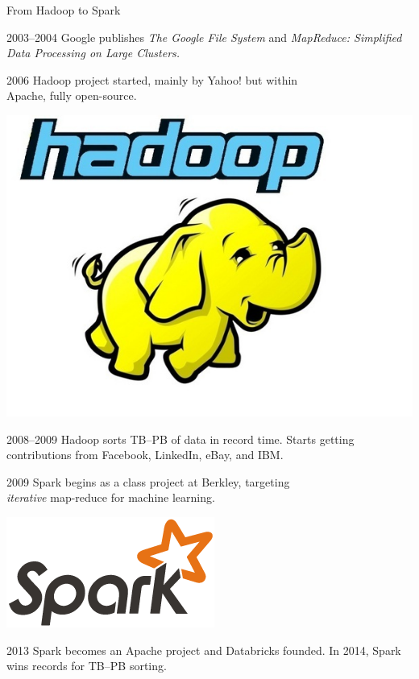 \documentclass{beamer}
\begin{document}
\begin{frame}{From Hadoop to Spark}
\begin{block}{2003--2004}
Google publishes {\it The Google File System} and {\it MapReduce: Simplified Data Processing on Large Clusters.}
\end{block}

\begin{block}{2006}
Hadoop project started, mainly by Yahoo! but within \\ Apache, fully open-source.

\vspace{-1.4 cm} \hfill \includegraphics[width=2 cm]{01_Hadoop_full.jpg}
\end{block}

\begin{block}{2008--2009}
Hadoop sorts TB--PB of data in record time. Starts getting contributions from Facebook, LinkedIn, eBay, and IBM.
\end{block}

\begin{block}{2009}
Spark begins as a class project at Berkley, targeting \\ {\it iterative} map-reduce for machine learning.

\vspace{-1.1 cm} \hfill \includegraphics[width=2 cm]{spark-logo.png}
\end{block}

\begin{block}{2013}
Spark becomes an Apache project and Databricks founded. In 2014, Spark wins records for TB--PB sorting.
\end{block}
\end{frame}
\end{document}
